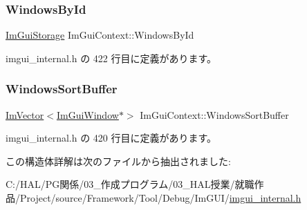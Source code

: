 \mbox{\label{struct_im_gui_context_adc1e46e1c1582a0f0eb74d957efedf98}} 
\subsubsection{\texorpdfstring{Windows\+By\+Id}{WindowsById}}
{\footnotesize\ttfamily \mbox{\hyperlink{struct_im_gui_storage}{Im\+Gui\+Storage}} Im\+Gui\+Context\+::\+Windows\+By\+Id}



 imgui\+\_\+internal.\+h の 422 行目に定義があります。

\mbox{\label{struct_im_gui_context_af33de778de28b057fa7a42e4cbe0017a}} 
\subsubsection{\texorpdfstring{Windows\+Sort\+Buffer}{WindowsSortBuffer}}
{\footnotesize\ttfamily \mbox{\hyperlink{class_im_vector}{Im\+Vector}}$<$\mbox{\hyperlink{struct_im_gui_window}{Im\+Gui\+Window}}$\ast$$>$ Im\+Gui\+Context\+::\+Windows\+Sort\+Buffer}



 imgui\+\_\+internal.\+h の 420 行目に定義があります。



この構造体詳解は次のファイルから抽出されました\+:\begin{DoxyCompactItemize}
\item 
C\+:/\+H\+A\+L/\+P\+G関係/03\+\_\+作成プログラム/03\+\_\+\+H\+A\+L授業/就職作品/\+Project/source/\+Framework/\+Tool/\+Debug/\+Im\+G\+U\+I/\mbox{\hyperlink{imgui__internal_8h}{imgui\+\_\+internal.\+h}}\end{DoxyCompactItemize}
